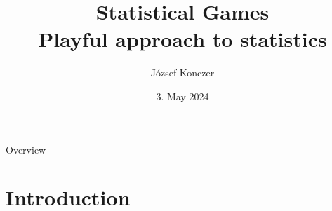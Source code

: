 \documentclass{beamer}
\begin{document}



\title[Statistical Games]{Statistical Games \\ {\small Playful approach to statistics}}
\author{József Konczer}
\date{3. May 2024}

\begin{frame}
\titlepage
\end{frame}




\begin{frame}{Overview}

\end{frame}

\section{Introduction}

\begin{frame}{}





\end{frame}


\begin{frame}{}

\end{frame}
\end{document}
